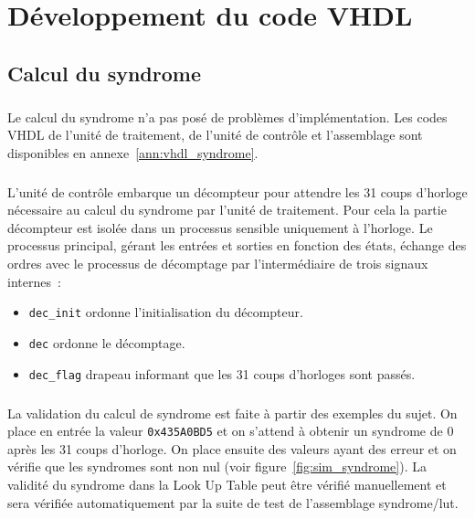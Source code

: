 \documentclass[a4paper, 11pt, svgnames]{report}
\begin{document}
    \chapter{Développement du code VHDL}
        \section{Calcul du syndrome}
            \paragraph{}
            Le calcul du syndrome n'a pas posé de problèmes d'implémentation.
            Les codes VHDL de l'unité de traitement, de l'unité de contrôle et
            l'assemblage sont disponibles en annexe~\ref{ann:vhdl_syndrome}.

            \paragraph{}
            L'unité de contrôle embarque un décompteur pour attendre les 31
            coups d'horloge nécessaire au calcul du syndrome par l'unité de
            traitement. Pour cela la partie décompteur est isolée dans un
            processus sensible uniquement à l'horloge. Le processus principal,
            gérant les entrées et sorties en fonction des états, échange des
            ordres avec le processus de décomptage par l'intermédiaire de trois
            signaux internes~:
            \begin{itemize}
                \item \verb$dec_init$ ordonne l'initialisation du décompteur.
                \item \verb$dec$ ordonne le décomptage.
                \item \verb$dec_flag$ drapeau informant que les 31 coups
                    d'horloges sont passés.
            \end{itemize}

            \paragraph{}
            La validation du calcul de syndrome est faite à partir des exemples
            du sujet. On place en entrée la valeur \verb$0x435A0BD5$ et on
            s'attend à obtenir un syndrome de 0 après les 31 coups d'horloge.
            On place ensuite des valeurs ayant des erreur et on vérifie que les
            syndromes sont non nul (voir figure~\ref{fig:sim_syndrome}). La
            validité du syndrome dans la Look Up Table peut être vérifié
            manuellement et sera vérifiée automatiquement par la suite de test
            de l'assemblage syndrome/lut.
\end{document}
